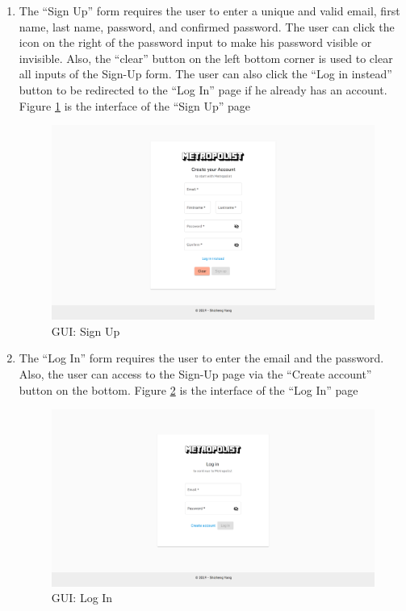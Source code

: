 \begin{enumerate}
  \item The ``Sign Up'' form requires the user to enter a unique and valid email, first name, last name, password, and confirmed password. The user can click the icon on the right of the password input to make his password visible or invisible. Also, the ``clear'' button on the left bottom corner is used to clear all inputs of the Sign-Up form. The user can also click the ``Log in instead'' button to be redirected to the ``Log In'' page if he already has an account. Figure \ref{fig:GUI signup} is the interface of the ``Sign Up'' page

  \begin{figure}[htbp]
  \centering
  \includegraphics[width=\textwidth]{section04/assets/GUI-signup.png}
  \caption[GUI: Sign Up]{\label{fig:GUI signup}GUI: Sign Up}
  \end{figure}

  \item The ``Log In'' form requires the user to enter the email and the password. Also, the user can access to the Sign-Up page via the ``Create account'' button on the bottom. Figure \ref{fig:GUI login} is the interface of the ``Log In'' page

  \begin{figure}[htbp]
  \centering
  \includegraphics[width=\textwidth]{section04/assets/GUI-login.png}
  \caption[GUI: Log In]{\label{fig:GUI login}GUI: Log In}
  \end{figure}


\end{enumerate}

